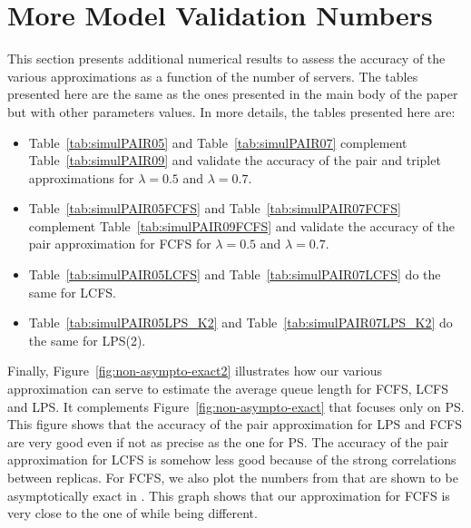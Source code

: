 \documentclass[acmsmall,nonacm]{acmart}
\newcommand\red[1]{{#1}}
\begin{document}
\section{More Model Validation Numbers}
\label{apx:more-numerical}

This section presents additional numerical results to assess the accuracy of the various approximations as a function of the number of servers. The tables presented here are the same as the ones presented in the main body of the paper but with other parameters values.  In more details, the tables presented here are:
\begin{itemize}
    \item Table~\ref{tab:simulPAIR05} and Table~\ref{tab:simulPAIR07} complement Table~\ref{tab:simulPAIR09} and validate the accuracy of the pair and triplet approximations for $\lambda=0.5$ and $\lambda=0.7$.
    \item Table~\ref{tab:simulPAIR05FCFS} and Table~\ref{tab:simulPAIR07FCFS} complement Table~\ref{tab:simulPAIR09FCFS} and validate the accuracy of the pair approximation for FCFS for $\lambda=0.5$ and $\lambda=0.7$.
    \item Table~\ref{tab:simulPAIR05LCFS} and Table~\ref{tab:simulPAIR07LCFS} do the same for LCFS.
    \item Table~\ref{tab:simulPAIR05LPS_K2} and Table~\ref{tab:simulPAIR07LPS_K2} do the same for LPS(2).
\end{itemize}
Finally, Figure~\ref{fig:non-asympto-exact2} illustrates how our various approximation can serve to estimate the average queue length for FCFS, LCFS and LPS. It complements Figure~\ref{fig:non-asympto-exact} that focuses only on PS. This figure shows that the accuracy of the pair approximation for LPS and FCFS are very good even if not as precise as the one for PS. The accuracy of the pair approximation for LCFS is somehow less good because of the strong correlations between replicas. \red{For FCFS, we also plot the numbers from \cite{gardner2017redundancy} that are shown to be asymptotically exact in \cite{shneer2020large}. This graph shows that our approximation for FCFS is very close to the one of \cite{gardner2017redundancy} while being different. }
\end{document}

